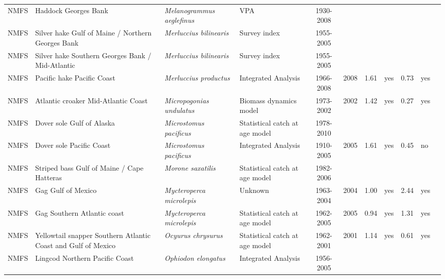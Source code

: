 \begin{longtable}{p{1.8cm}p{3.5cm}p{3.5cm}p{3cm}cccp{0.9cm}cp{0.9cm}c}
  NMFS & Haddock Georges Bank & \textit{Melanogrammus aeglefinus} & VPA & 1930-2008 &  &  &  &  &  & \cite{NMFS-5Z-Melanogrammusaeglefinus-2008.pdf} \\ 
  NMFS & Silver hake Gulf of Maine / Northern Georges Bank & \textit{Merluccius bilinearis} & Survey index & 1955-2005 &  &  &  &  &  & \cite{SilverHake-2005-NEFSC-Assessment.pdf} \\ 
  NMFS & Silver hake Southern Georges Bank / Mid-Atlantic & \textit{Merluccius bilinearis} & Survey index & 1955-2005 &  &  &  &  &  & \cite{SilverHake-2005-NEFSC-Assessment.pdf} \\ 
  NMFS & Pacific hake Pacific Coast & \textit{Merluccius productus} & Integrated Analysis & 1966-2008 & 2008 & 1.61 & yes & 0.73 & yes & \cite{NWFSC-PHAKEPCOAST-2008-Pacific-Hake-US-Canada.pdf} \\ 
  NMFS & Atlantic croaker Mid-Atlantic Coast & \textit{Micropogonias undulatus} & Biomass dynamics model & 1973-2002 & 2002 & 1.42 & yes & 0.27 & yes & \cite{2004_ASMFC_AtlCroak.pdf} \\ 
  NMFS & Dover sole Gulf of Alaska & \textit{Microstomus pacificus} & Statistical catch at age model & 1978-2010 &  &  &  &  &  & \cite{2007_SAFE_GOAdeepflat.pdf} \\ 
  NMFS & Dover sole Pacific Coast & \textit{Microstomus pacificus} & Integrated Analysis & 1910-2005 & 2005 & 1.61 & yes & 0.45 & no & \cite{2005-SAFE-WCdover.pdf} \\ 
  NMFS & Striped bass Gulf of Maine / Cape Hatteras & \textit{Morone saxatilis} & Statistical catch at age model & 1982-2006 &  &  &  &  &  & \cite{07AssessmentReport.pdf} \\ 
  NMFS & Gag Gulf of Mexico & \textit{Mycteroperca microlepis} & Unknown & 1963-2004 & 2004 & 1.00 & yes & 2.44 & yes & \cite{JENSEN_GAGGM_2007.pdf} \\ 
  NMFS & Gag Southern Atlantic coast & \textit{Mycteroperca microlepis} & Statistical catch at age model & 1962-2005 & 2005 & 0.94 & yes & 1.31 & yes & \cite{JENSEN_GAGSATLC_2006.pdf} \\ 
  NMFS & Yellowtail snapper Southern Atlantic Coast and Gulf of Mexico & \textit{Ocyurus chrysurus} & Statistical catch at age model & 1962-2001 & 2001 & 1.14 & yes & 0.61 & yes & \cite{2003_SEDAR_Yellowtailsnapper.pdf} \\ 
  NMFS & Lingcod Northern Pacific Coast & \textit{Ophiodon elongatus} & Integrated Analysis & 1956-2005 &  &  &  &  &  & \cite{2005-SAFE-WClingcod.pdf} \\ 

\end{longtable}
